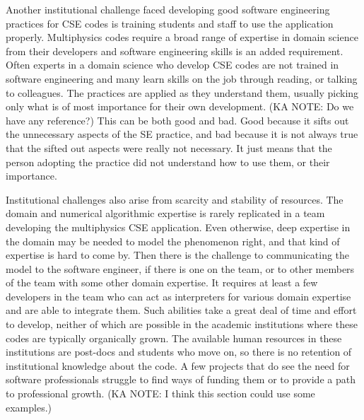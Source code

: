 Another institutional challenge faced developing good software engineering practices for CSE codes is 
training students and staff to use the application properly. Multiphysics codes require a broad range of expertise in
domain science from their developers and software engineering skills is an added
requirement.  Often experts in a domain science who develop CSE codes are not trained in software engineering and many learn skills on
the job through reading, or talking to colleagues. The practices are
applied as they understand them, usually picking only what is of most
importance for their own development.  (KA NOTE: Do we have any reference?) This can be both good and
bad. Good because it sifts out the unnecessary aspects of the SE
practice, and bad because it is not always true that the sifted out
aspects were really not necessary. It just means that the person
adopting the practice did not understand how to use them, or their
importance. 


Institutional challenges also arise from scarcity and stability of
resources. The domain and numerical algorithmic
expertise is rarely replicated in a team developing the multiphysics
CSE application.  Even otherwise, deep expertise in the domain may be
needed to model the phenomenon right, and that kind of expertise is
hard to come by. Then there is the challenge to communicating the
model to the software engineer, if there is one on the team, or to
other members of the team with some other domain expertise. It requires at least a
few developers in the team who can act as interpreters for various
domain expertise and are able to integrate them. Such abilities take a
great deal of time and effort to develop, neither of which are
possible in the academic institutions where these codes are typically
organically grown. The available human resources in these institutions
are post-docs and students who move on, so there is no retention of
institutional knowledge about the code.  A few projects that do see
the need for software professionals struggle to find ways of funding
them or to provide a path to professional growth. (KA NOTE: I think this section could use some examples.)

